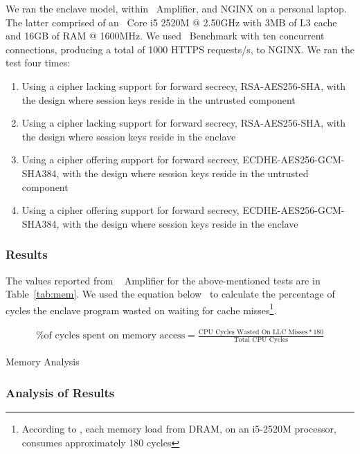 \documentclass[../../../main.tex]{subfiles}
\begin{document}
We ran the enclave model, within \VTune~Amplifier, and NGINX on a
personal laptop. The latter comprised of an \Intel~Core i5 2520M @
2.50GHz with 3MB of L3 cache and 16GB of RAM @ 1600MHz. We used
\Apache~Benchmark with ten concurrent connections, producing a total
of 1000 HTTPS requests/s, to NGINX. We ran the test four times:
\begin{enumerate}
  \item Using a cipher lacking support for forward secrecy,
    RSA-AES256-SHA, with the design where session keys reside in the
    untrusted component
  \item Using a cipher lacking support for forward secrecy,
    RSA-AES256-SHA, with the design where session keys reside in the
    enclave
  \item Using a cipher offering support for forward secrecy,
    ECDHE-AES256-GCM-SHA384, with the design where session keys reside in
    the untrusted component
  \item Using a cipher offering support for forward secrecy,
    ECDHE-AES256-GCM-SHA384, with the design where session keys reside in
    the enclave
\end{enumerate}

\subsubsection*{Results}
The values reported from \VTune~ Amplifier for the above-mentioned
tests are in Table~\ref{tab:mem}. We used the equation
below~\cite{intel-eqn} to calculate the percentage of cycles the
enclave program wasted on waiting for cache misses\footnote{According
  to \Intel, each memory load from DRAM, on an i5-2520M processor,
  consumes approximately 180 cycles}.

\begin{align*}
 \text{\% of cycles spent on memory access} = 
    \frac{\text{CPU Cycles Wasted On LLC Misses} * 180}{\text{Total CPU
    Cycles}}
\end{align*}

\begin{table}[H]
  \caption{Memory Analysis}
  \label{tab:mem}
\end{table}

\subsubsection*{Analysis of Results}
\end{document}
